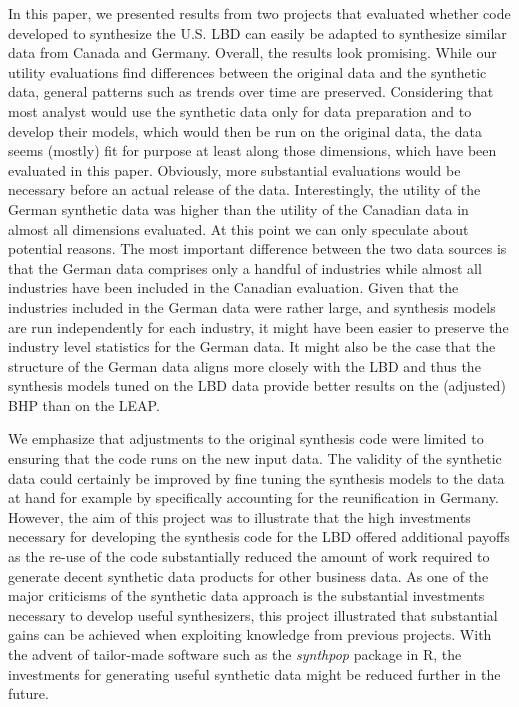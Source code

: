 
In this paper, we presented results from two projects that evaluated whether code developed to synthesize the U.S. LBD can easily be adapted to synthesize similar data from Canada and Germany. Overall, the results look promising. While our utility evaluations find differences between the original data and the synthetic data, general patterns such as trends over time are preserved. Considering that most analyst would use the synthetic data only for data preparation and to develop their models, which would then be run on the original data, the data seems (mostly) fit for purpose at least along those dimensions, which have been evaluated in this paper. Obviously, more substantial evaluations would be necessary before an actual release of the data. Interestingly, the utility of the German synthetic data was higher than the utility of the Canadian data in almost all dimensions evaluated. At this point we can only speculate about potential reasons. The most important difference between the two data sources is that the German data comprises only a handful of industries while almost all industries have been included in the Canadian evaluation. Given that the industries included in the German data were rather large, and synthesis models are run independently for each industry, it might have been easier to preserve the industry level statistics for the German data. It might also be the case that the structure of the German data aligns more closely with the LBD and thus the synthesis models tuned on the LBD data provide better results on the (adjusted) BHP than on the LEAP. 

We emphasize that adjustments to the original synthesis code were limited to ensuring that the code runs on the new input data. The validity of the synthetic data could certainly be improved by fine tuning the synthesis models to the data at hand for example by specifically accounting for the reunification in Germany. However, the aim of this project was to illustrate that the high investments necessary for developing the synthesis code for the LBD offered additional payoffs as the re-use of the code substantially reduced the amount of work required to generate decent synthetic data products for other business data. As one of the major criticisms of the synthetic data approach is the substantial investments necessary to develop useful synthesizers, this project illustrated that substantial gains can be achieved when exploiting knowledge from previous projects. With the advent of tailor-made software such as the \textit{synthpop} package in R, the investments for generating useful synthetic data might be reduced further in the future.
